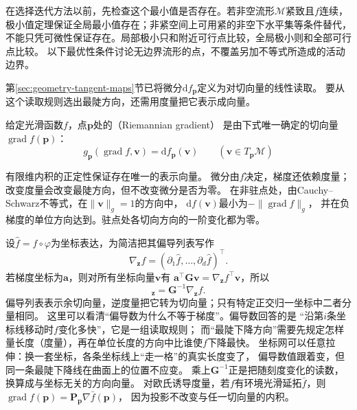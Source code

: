 在选择迭代方法以前，先检查这个最小值是否存在。若非空流形$\mathcal M$紧致且$f$连续，
极小值定理保证全局最小值存在；非紧空间上可用紧的非空下水平集等条件替代，
不能只凭可微性保证存在。局部极小只和附近可行点比较，全局极小则和全部可行点比较。
以下最优性条件讨论无边界流形的点，不覆盖另加不等式所造成的活动边界。

第\ref{sec:geometry-tangent-maps}节已将微分$\mathrm df_{\bm p}$定义为对切向量的线性读取。
要从这个读取规则选出最陡方向，还需用度量把它表示成向量。
\begin{definition}[Riemann梯度]
\label{def:geometry-riemannian-gradient}
给定光滑函数$f$，点$\bm p$处的（Riemannian gradient）
是由下式唯一确定的切向量$\operatorname{grad}f(\bm p)$：
\begin{equation}
 g_{\bm p}(\operatorname{grad}f,\bm v)=\mathrm df_{\bm p}(\bm v)
 \qquad(\bm v\in T_{\bm p}\mathcal M)
 \label{eq:geometry-riemannian-gradient-definition}
\end{equation}
\end{definition}
有限维内积的正定性保证存在唯一的表示向量。
微分由$f$决定，梯度还依赖度量；改变度量会改变最陡方向，但不改变微分是否为零。
在非驻点处，由Cauchy--Schwarz不等式，在$\lVert\bm v\rVert_g=1$的方向中，
$\mathrm df(\bm v)$最小为$-\lVert\operatorname{grad}f\rVert_g$，
并在负梯度的单位方向达到。驻点处各切向方向的一阶变化都为零。

设$\widehat f=f\circ\varphi$为坐标表达，为简洁把其偏导列表写作
\[
 \nabla_{\bm z}f=(\partial_1\widehat f,\ldots,\partial_d\widehat f)^\top.
\]
若梯度坐标为$\bm a$，则对所有坐标向量$\bm v$有
$\bm a^\top\bm G\bm v=\nabla_{\bm z}f^\top\bm v$，所以
\begin{equation}
 [\operatorname{grad}f]_{\bm z}=\bm G^{-1}\nabla_{\bm z}f.
 \label{eq:geometry-riemannian-gradient-coordinates}
\end{equation}
偏导列表表示余切向量，逆度量把它转为切向量；只有特定正交归一坐标中二者分量相同。
这里可以看清“偏导数为什么不等于梯度”。偏导数回答的是
“沿第$i$条坐标线移动时$f$变化多快”，它是一组读取规则；
而“最陡下降方向”需要先规定怎样量长度（度量），再在单位长度的方向中比谁使$f$下降最快。
坐标网可以任意拉伸：换一套坐标，各条坐标线上“走一格”的真实长度变了，
偏导数值跟着变，但同一条最陡下降线在曲面上的位置不应变。
乘上$\bm G^{-1}$正是把随刻度变化的读数，换算成与坐标无关的方向向量。
对欧氏诱导度量，若$f$有环境光滑延拓$\bar f$，则
$\operatorname{grad}f(\bm p)=\bm P_{\bm p}\nabla\bar f(\bm p)$，
因为投影不改变与任一切向量的内积。

